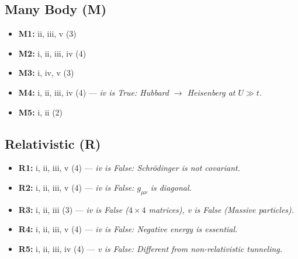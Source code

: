 \documentclass[a4paper,12pt]{article}
\begin{document}
\subsection*{Many Body (M)}
\begin{itemize}
    \item \textbf{M1:} ii, iii, v (3)
    \item \textbf{M2:} i, ii, iii, iv (4)
    \item \textbf{M3:} i, iv, v (3)
    \item \textbf{M4:} i, ii, iii, iv (4) --- \textit{iv is True: Hubbard $\to$ Heisenberg at $U \gg t$.}
    \item \textbf{M5:} i, ii (2)
\end{itemize}

\subsection*{Relativistic (R)}
\begin{itemize}
    \item \textbf{R1:} i, ii, iii, v (4) --- \textit{iv is False: Schrödinger is not covariant.}
    \item \textbf{R2:} i, ii, iii, v (4) --- \textit{iv is False: $g_{\mu\nu}$ is diagonal.}
\end{itemize}

\begin{itemize}
    \item \textbf{R3:} i, ii, iii (3) --- \textit{iv is False ($4 \times 4$ matrices), v is False (Massive particles).}
    \item \textbf{R4:} i, ii, iii, v (4) --- \textit{iv is False: Negative energy is essential.}
    \item \textbf{R5:} i, ii, iii, iv (4) --- \textit{v is False: Different from non-relativistic tunneling.}
\end{itemize}
\end{document}
